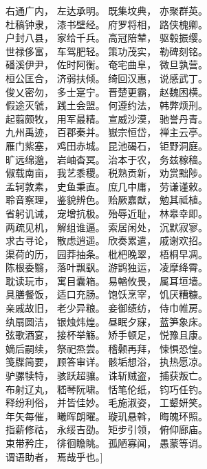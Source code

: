 {     右通广内， 左达承明。 既集坟典， 亦聚群英。\\
     杜稿钟隶， 漆书壁经。 府罗将相， 路侠槐卿。\\
     户封八县， 家给千兵。 高冠陪辇， 驱毂振缨。\\
     世禄侈富， 车驾肥轻。 策功茂实， 勒碑刻铭。\\
     磻溪伊尹， 佐时阿衡。 奄宅曲阜， 微旦孰营。\\
     桓公匡合， 济弱扶倾。 绮回汉惠， 说感武丁。\\
     俊乂密勿， 多士寔宁。 晋楚更霸， 赵魏困横。\\
     假途灭虢， 践土会盟。 何遵约法， 韩弊烦刑。\\
     起翦颇牧， 用军最精。 宣威沙漠， 驰誉丹青。\\
     九州禹迹， 百郡秦并。 嶽宗恒岱， 禅主云亭。\\
     雁门紫塞， 鸡田赤城。 昆池碣石， 钜野洞庭。\\
     旷远绵邈， 岩岫杳冥。 治本于农， 务兹稼穑。\\
     俶载南亩， 我艺黍稷。 税熟贡新， 劝赏黜陟。\\
     孟轲敦素， 史鱼秉直。 庶几中庸， 劳谦谨敕。\\
     聆音察理， 鉴貌辨色。 贻厥嘉猷， 勉其祗植。\\
     省躬讥诫， 宠增抗极。 殆辱近耻， 林皋幸即。\\
     两疏见机， 解组谁逼。 索居闲处， 沉默寂寥。\\
     求古寻论， 散虑逍遥。 欣奏累遣， 戚谢欢招。\\
     渠荷的历， 园莽抽条。 枇杷晚翠， 梧桐早凋。\\
     陈根委翳， 落叶飘飖。 游鹍独运， 凌摩绛霄。\\
     耽读玩市， 寓目囊箱。 易輶攸畏， 属耳垣墙。\\
     具膳餐饭， 适口充肠。 饱饫烹宰， 饥厌糟糠。\\
     亲戚故旧， 老少异粮。 妾御绩纺， 侍巾帷房。\\
     纨扇圆洁， 银烛炜煌。 昼眠夕寐， 蓝笋象床。\\
     弦歌酒宴， 接杯举觞。 矫手顿足， 悦豫且康。\\
     嫡后嗣续， 祭祀烝尝。 稽颡再拜， 悚惧恐惶。\\
     笺牒简要， 顾答审详。 骸垢想浴， 执热愿凉。\\
     驴骡犊特， 骇跃超骧。 诛斩贼盗， 捕获叛亡。\\
     布射辽丸， 嵇琴阮啸。 恬笔伦纸， 钧巧任钓。\\
     释纷利俗， 并皆佳妙。 毛施淑姿， 工颦妍笑。\\
     年矢每催， 曦晖朗曜。 璇玑悬斡， 晦魄环照。\\
     指薪修祜， 永绥吉劭。 矩步引领， 俯仰廊庙。\\
     束带矜庄， 徘徊瞻眺。 孤陋寡闻， 愚蒙等诮。\\
     谓语助者， 焉哉乎也。}]
